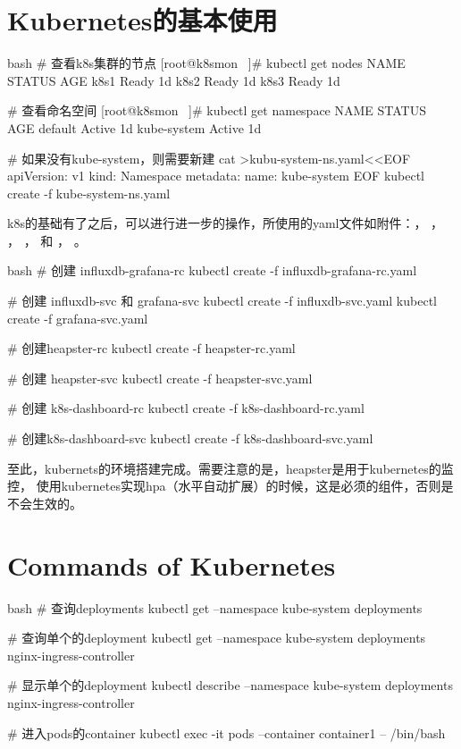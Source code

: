 \section{Kubernetes的基本使用}
\begin{code-block}{bash}
# 查看k8s集群的节点
[root@k8smon ~]# kubectl get nodes
NAME      STATUS    AGE
k8s1      Ready     1d
k8s2      Ready     1d
k8s3      Ready     1d

# 查看命名空间
[root@k8smon ~]# kubectl get namespace
NAME          STATUS    AGE
default       Active    1d
kube-system   Active    1d

# 如果没有kube-system，则需要新建
cat >kubu-system-ns.yaml<<EOF
apiVersion: v1
kind: Namespace
metadata:
  name: kube-system
EOF
kubectl create -f kube-system-ns.yaml
\end{code-block}

k8s的基础有了之后，可以进行进一步的操作，所使用的yaml文件如附件：，
，
，
，
和
，
。
\begin{code-block}{bash}
# 创建 influxdb-grafana-rc
kubectl create -f influxdb-grafana-rc.yaml

# 创建 influxdb-svc 和 grafana-svc
kubectl create -f influxdb-svc.yaml
kubectl create -f grafana-svc.yaml

# 创建heapster-rc
kubectl create -f heapster-rc.yaml

# 创建 heapster-svc
kubectl create -f heapster-svc.yaml

# 创建 k8s-dashboard-rc
kubectl create -f k8s-dashboard-rc.yaml

# 创建k8s-dashboard-svc
kubectl create -f k8s-dashboard-svc.yaml
\end{code-block}

至此，kubernets的环境搭建完成。需要注意的是，heapster是用于kubernetes的监控，
使用kubernetes实现hpa（水平自动扩展）的时候，这是必须的组件，否则是不会生效的。

\section{Commands of Kubernetes}
\begin{code-block}{bash}
# 查询deployments
kubectl get --namespace kube-system deployments

# 查询单个的deployment
kubectl get --namespace kube-system deployments nginx-ingress-controller

# 显示单个的deployment
kubectl describe --namespace kube-system deployments nginx-ingress-controller

# 进入pods的container
kubectl exec -it pods --container container1 -- /bin/bash

\end{code-block}
